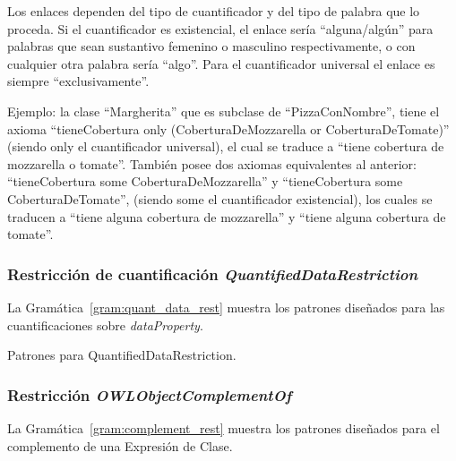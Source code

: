 Los enlaces dependen del tipo de cuantificador y del tipo de palabra que lo proceda. Si el cuantificador es existencial, el enlace sería ``alguna/algún'' para palabras que sean sustantivo femenino o masculino respectivamente, o con cualquier otra palabra sería ``algo''.  Para el cuantificador universal el enlace es siempre ``exclusivamente''.

Ejemplo: la clase ``Margherita'' que es subclase de ``PizzaConNombre'', tiene el axioma ``tieneCobertura only 
    (CoberturaDeMozzarella or CoberturaDeTomate)'' (siendo only el cuantificador universal), el cual se traduce a ``tiene cobertura de mozzarella o tomate''. También posee dos axiomas equivalentes al anterior: ``tieneCobertura some CoberturaDeMozzarella'' y ``tieneCobertura some CoberturaDeTomate'', (siendo some el cuantificador existencial), los cuales se traducen a ``tiene alguna cobertura de mozzarella'' y ``tiene alguna cobertura de tomate''.


\subsubsection{Restricción de cuantificación \emph{QuantifiedDataRestriction}}
La Gramática~\ref{gram:quant_data_rest} muestra los patrones diseñados para las cuantificaciones sobre \emph{dataProperty}.

\begin{GrammarEnv}
\begin{grammar}
\end{grammar}
\caption{Patrones para QuantifiedDataRestriction.}\label{gram:quant_data_rest}
\end{GrammarEnv}

\subsubsection{Restricción \emph{OWLObjectComplementOf}}
La Gramática~\ref{gram:complement_rest} muestra los patrones diseñados para el complemento de una Expresión de Clase.

